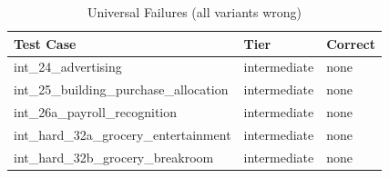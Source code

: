 \begin{table}[htbp]
\centering
\caption{Universal Failures (all variants wrong)}
\label{tab:all-fail}
\begin{tabular}{l l l}
\toprule
Test Case & Tier & Correct \\
\midrule
  int\_24\_advertising & intermediate & none \\
  int\_25\_building\_purchase\_allocation & intermediate & none \\
  int\_26a\_payroll\_recognition & intermediate & none \\
  int\_hard\_32a\_grocery\_entertainment & intermediate & none \\
  int\_hard\_32b\_grocery\_breakroom & intermediate & none \\
\bottomrule
\end{tabular}
\end{table}
